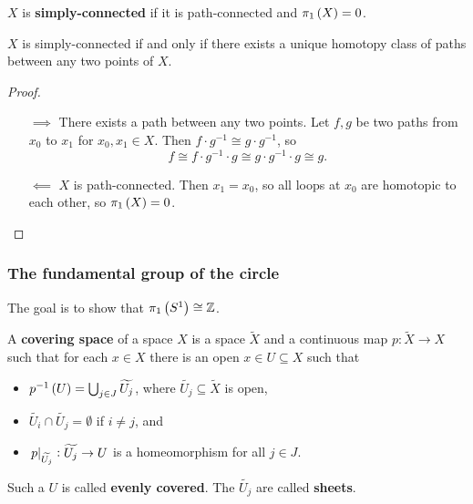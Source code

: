\begin{definition*}
$ X $ is \textbf{simply-connected} if it is path-connected and $ \pi_1\br{X} = 0 $.
\end{definition*}

\begin{proposition}
\label{prop:1.6}
$ X $ is simply-connected if and only if there exists a unique homotopy class of paths between any two points of $ X $.
\end{proposition}

\begin{proof}
\hfill
\begin{itemize}
\item[$ \implies $] There exists a path between any two points. Let $ f, g $ be two paths from $ x_0 $ to $ x_1 $ for $ x_0, x_1 \in X $. Then $ f \cdot g^{-1} \cong g \cdot g^{-1} $, so
$$ f \cong f \cdot g^{-1} \cdot g \cong g \cdot g^{-1} \cdot g \cong g. $$
\item[$ \impliedby $] $ X $ is path-connected. Then $ x_1 = x_0 $, so all loops at $ x_0 $ are homotopic to each other, so $ \pi_1\br{X} = 0 $.
\end{itemize}
\end{proof}

\pagebreak

\subsubsection{The fundamental group of the circle}

The goal is to show that $ \pi_1\br{S^1} \cong \Z $.


\begin{definition*}
A \textbf{covering space} of a space $ X $ is a space $ \widetilde{X} $ and a continuous map $ p : \widetilde{X} \to X $ such that for each $ x \in X $ there is an open $ x \in U \subseteq X $ such that
\begin{itemize}
\item $ p^{-1}\br{U} = \bigcup_{j \in J} \widetilde{U_j} $, where $ \widetilde{U_j} \subseteq \widetilde{X} $ is open,
\item $ \widetilde{U_i} \cap \widetilde{U_j} = \emptyset $ if $ i \ne j $, and
\item $ \left. p \right|_{\widetilde{U_j}} : \widetilde{U_j} \to U $ is a homeomorphism for all $ j \in J $.
\end{itemize}
Such a $ U $ is called \textbf{evenly covered}. The $ \widetilde{U_j} $ are called \textbf{sheets}.
\end{definition*}

